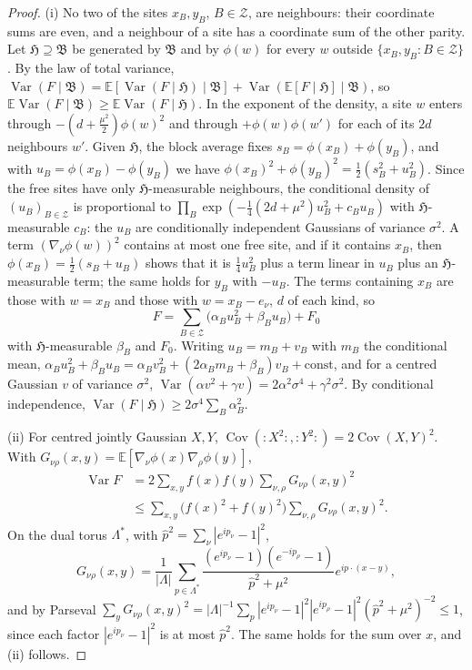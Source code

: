 \documentclass[aps,prd,twocolumn,superscriptaddress,nofootinbib,longbibliography,floatfix,amsmath,amssymb,10pt]{revtex4-2}
\theoremstyle{definition}
\theoremstyle{remark}
\newcommand{\E}{\mathbb{E}}
\newcommand{\Cov}{\operatorname{Cov}}
\newcommand{\Var}{\operatorname{Var}}
\begin{document}
\begin{proof}
(i) No two of the sites $x_B,y_B$, $B\in\mathcal Z$, are neighbours: their
coordinate sums are even, and a neighbour of a site has a coordinate sum of
the other parity. Let $\mathfrak H\supseteq\mathfrak B$ be generated by
$\mathfrak B$ and by $\phi(w)$ for every $w$ outside
$\{x_B,y_B:B\in\mathcal Z\}$. By the law of total variance,
$\Var(F\mid\mathfrak B)=\E[\Var(F\mid\mathfrak H)\mid\mathfrak B]
+\Var(\E[F\mid\mathfrak H]\mid\mathfrak B)$, so
$\E\Var(F\mid\mathfrak B)\ge\E\Var(F\mid\mathfrak H)$. In the exponent of the
density, a site $w$ enters through $-(d+\frac{\mu^2}2)\phi(w)^2$ and through
$+\phi(w)\phi(w')$ for each of its $2d$ neighbours $w'$. Given $\mathfrak H$,
the block average fixes $s_B=\phi(x_B)+\phi(y_B)$, and with
$u_B=\phi(x_B)-\phi(y_B)$ we have $\phi(x_B)^2+\phi(y_B)^2=\frac12(s_B^2+
u_B^2)$. Since the free sites have only $\mathfrak H$-measurable neighbours,
the conditional density of $(u_B)_{B\in\mathcal Z}$ is proportional to
$\prod_B\exp(-\frac14(2d+\mu^2)u_B^2+c_Bu_B)$ with $\mathfrak H$-measurable
$c_B$: the $u_B$ are conditionally independent Gaussians of variance
$\sigma^2$. A term $(\nabla_\nu\phi(w))^2$ contains at most one free site,
and if it contains $x_B$, then $\phi(x_B)=\frac12(s_B+u_B)$ shows that it is
$\frac14u_B^2$ plus a term linear in $u_B$ plus an $\mathfrak
H$-measurable term; the same holds for $y_B$ with $-u_B$. The terms
containing $x_B$ are those with $w=x_B$ and those with $w=x_B-e_\nu$, $d$ of
each kind, so
\[
F=\sum_{B\in\mathcal Z}\bigl(\alpha_Bu_B^2+\beta_Bu_B\bigr)+F_0
\]
with $\mathfrak H$-measurable $\beta_B$ and $F_0$. Writing
$u_B=m_B+v_B$ with $m_B$ the conditional mean, $\alpha_Bu_B^2+\beta_Bu_B=
\alpha_Bv_B^2+(2\alpha_Bm_B+\beta_B)v_B+\text{const}$, and for a centred
Gaussian $v$ of variance $\sigma^2$, $\Var(\alpha v^2+\gamma v)=2\alpha^2
\sigma^4+\gamma^2\sigma^2$. By conditional independence,
$\Var(F\mid\mathfrak H)\ge2\sigma^4\sum_B\alpha_B^2$.

(ii) For centred jointly Gaussian $X,Y$, $\Cov({:}X^2{:},{:}Y^2{:})=2\Cov(X,Y)^2$.
With $G_{\nu\rho}(x,y)=\E[\nabla_\nu\phi(x)\nabla_\rho\phi(y)]$,
\[
\begin{split}
\Var F&=2\sum_{x,y}f(x)f(y)\sum_{\nu,\rho}G_{\nu\rho}(x,y)^2\\
&\le\sum_{x,y}\bigl(f(x)^2+f(y)^2\bigr)\sum_{\nu,\rho}G_{\nu\rho}(x,y)^2 .
\end{split}
\]
On the dual torus $\Lambda^*$, with $\hat p^2=\sum_\nu|e^{ip_\nu}-1|^2$,
\[
G_{\nu\rho}(x,y)=\frac1{|\Lambda|}\sum_{p\in\Lambda^*}
\frac{(e^{ip_\nu}-1)(e^{-ip_\rho}-1)}{\hat p^2+\mu^2}e^{ip\cdot(x-y)},
\]
and by Parseval
$\sum_yG_{\nu\rho}(x,y)^2=|\Lambda|^{-1}\sum_p|e^{ip_\nu}-1|^2
|e^{ip_\rho}-1|^2(\hat p^2+\mu^2)^{-2}\le1$, since each factor
$|e^{ip_\nu}-1|^2$ is at most $\hat p^2$. The same holds for the sum over
$x$, and (ii) follows.


\end{proof}
\end{document}
